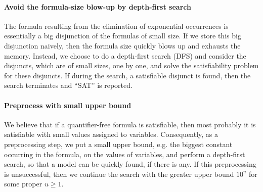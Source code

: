\paragraph{Avoid the formula-size blow-up by depth-first search}

The {\pa} formula resulting from the elimination of exponential occurrences is essentially a big disjunction of the formulas of small size. If we store this big disjunction naively, then the formula size quickly blows up and exhausts the memory. Instead, we choose to do a depth-first search (DFS) and consider the disjuncts, which are of small sizes, one by one, and solve the satisfiability problem for these disjuncts. If during the search, a satisfiable disjunct is found, then the search terminates and ``SAT'' is reported.

\paragraph{Preprocess with small upper bound}

We believe that if a quantifier-free {\paexp} formula is satisfiable, then most probably it is satisfiable with small values assigned to variables. Consequently, as a preprocessing step, we put a small upper bound, e.g. the biggest constant occurring in the formula, on the values of variables, and perform a depth-first search, so that a model can be quickly found, if there is any. If this preprocessing is unsuccessful, then we continue the search with the greater upper bound $10^u$ for some proper $u \ge 1$.
